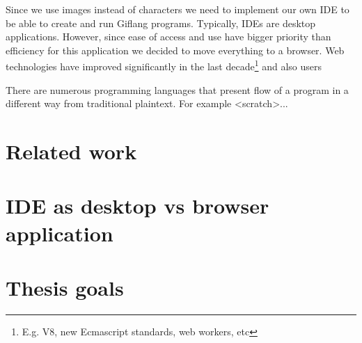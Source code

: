 Since we use images instead of characters we need to implement our own IDE to be able to create and run Giflang programs. Typically,
IDEs are desktop applications. However, since ease of access and use have bigger priority than efficiency for this application
we decided to move everything to a browser. Web technologies have improved significantly in the last decade\footnote{E.g. V8, new Ecmascript standards, web workers, etc}
and also users 

There are numerous programming languages that present flow of a program in a different way
from traditional plaintext. For example <scratch>...
\cite{Andel07}

\section{Related work}

\section{IDE as desktop vs browser application}

\section{Thesis goals}
